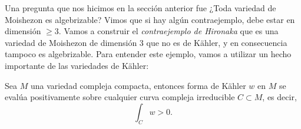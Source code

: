 Una pregunta que nos hicimos en la sección anterior fue ¿Toda variedad de Moishezon es algebrizable? Vimos que si hay algún contraejemplo, debe estar en dimensión $\geq 3$. Vamos a construir el \textit{contraejemplo de Hironaka} que es una variedad de Moishezon de dimensión 3 que no es de Kähler, y en consecuencia tampoco es algebrizable. Para entender este ejemplo, vamos a utilizar un hecho importante de las variedades de Kähler:

\begin{theorem}\label{integralpositiva}
	Sea $M$ una variedad compleja compacta, entonces forma de Kähler $w$ en $M$ se evalúa positivamente sobre cualquier curva compleja irreducible $C\subset M$, es decir,
	\begin{equation*}
		\int_C w>0.
	\end{equation*}
\end{theorem}

